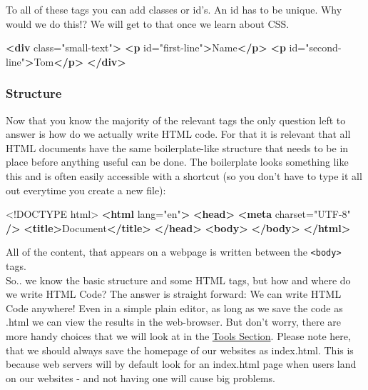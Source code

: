\documentclass[
]{article}
\newenvironment{Shaded}{\begin{snugshade}}{\end{snugshade}}
\newcommand{\DataTypeTok}[1]{\textcolor[rgb]{0.13,0.29,0.53}{#1}}
\newcommand{\KeywordTok}[1]{\textcolor[rgb]{0.13,0.29,0.53}{\textbf{#1}}}
\newcommand{\NormalTok}[1]{#1}
\newcommand{\OtherTok}[1]{\textcolor[rgb]{0.56,0.35,0.01}{#1}}
\newcommand{\StringTok}[1]{\textcolor[rgb]{0.31,0.60,0.02}{#1}}
\begin{document}
To all of these tags you can add classes or id's. An id has to be unique. Why would we do this!? We will get to that once we learn about CSS.

\begin{Shaded}
\begin{Highlighting}[]
\KeywordTok{<div}\OtherTok{ class=}\StringTok{"small-text"}\KeywordTok{>}
  \KeywordTok{<p}\OtherTok{ id=}\StringTok{"first-line"}\KeywordTok{>}\NormalTok{Name}\KeywordTok{</p>}
  \KeywordTok{<p}\OtherTok{ id=}\StringTok{"second-line"}\KeywordTok{>}\NormalTok{Tom}\KeywordTok{</p>}
\KeywordTok{</div>}
\end{Highlighting}
\end{Shaded}

\hypertarget{structure}{%
\subsubsection*{Structure}\label{structure}}

Now that you know the majority of the relevant tags the only question left to answer is how do we actually write HTML code. For that it is relevant that all HTML documents have the same boilerplate-like structure that needs to be in place before anything useful can be done. The boilerplate looks something like this and is often easily accessible with a shortcut (so you don't have to type it all out everytime you create a new file):

\begin{Shaded}
\begin{Highlighting}[]
\DataTypeTok{<!DOCTYPE }\NormalTok{html}\DataTypeTok{>}
\KeywordTok{<html}\OtherTok{ lang=}\StringTok{"en"}\KeywordTok{>}
  \KeywordTok{<head>}
    \KeywordTok{<meta}\OtherTok{ charset=}\StringTok{"UTF-8"} \KeywordTok{/>}
    \KeywordTok{<title>}\NormalTok{Document}\KeywordTok{</title>}
  \KeywordTok{</head>}
  \KeywordTok{<body>}
  \KeywordTok{</body>}
\KeywordTok{</html>}
\end{Highlighting}
\end{Shaded}

All of the content, that appears on a webpage is written between the \texttt{\textless{}body\textgreater{}} tags.\\
So.. we know the basic structure and some HTML tags, but how and where do we write HTML Code? The answer is straight forward: We can write HTML Code anywhere! Even in a simple plain editor, as long as we save the code as .html we can view the results in the web-browser. But don't worry, there are more handy choices that we will look at in the \protect\hyperlink{tools}{Tools Section}. Please note here, that we should always save the homepage of our websites as index.html. This is because web servers will by default look for an index.html page when users land on our websites - and not having one will cause big problems.
\end{document}
